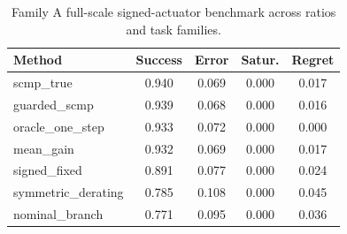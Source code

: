 \begin{table}[t]
\centering
\small
\caption{Family A full-scale signed-actuator benchmark across ratios and task families.}
\label{tab:main-full-scale}
\begin{tabular}{lcccc}
\toprule
Method & Success & Error & Satur. & Regret \\
\midrule
scmp\_true & 0.940 & 0.069 & 0.000 & 0.017 \\
guarded\_scmp & 0.939 & 0.068 & 0.000 & 0.016 \\
oracle\_one\_step & 0.933 & 0.072 & 0.000 & 0.000 \\
mean\_gain & 0.932 & 0.069 & 0.000 & 0.017 \\
signed\_fixed & 0.891 & 0.077 & 0.000 & 0.024 \\
symmetric\_derating & 0.785 & 0.108 & 0.000 & 0.045 \\
nominal\_branch & 0.771 & 0.095 & 0.000 & 0.036 \\
\bottomrule
\end{tabular}
\end{table}
